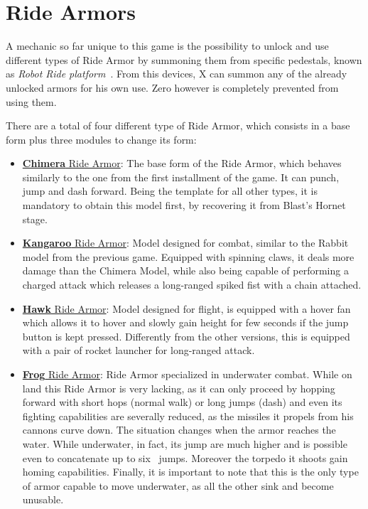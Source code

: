 \section{Ride Armors}
A mechanic so far unique to this game is the possibility to unlock and use different types of Ride Armor by summoning them from specific pedestals, known as \textit{Robot Ride platform}~\cite{X3:Manual}. From this devices, X can summon any of the already unlocked armors for his own use. Zero however is completely prevented from using them.

There are a total of four different type of Ride Armor, which consists in a base form plus three modules to change its form:
\begin{itemize}
	\item \hyperlink{vehicle:Ride_Armor_Chimera}{\textbf{Chimera} Ride Armor}: The base form of the Ride Armor, which behaves similarly to the one from the first installment of the game. It can punch, jump and dash forward. Being the template for all other types, it is mandatory to obtain this model first, by recovering it from Blast's Hornet stage.
	\item \hyperlink{vehicle:Ride_Armor_Kangaroo}{\textbf{Kangaroo} Ride Armor}: Model designed for combat, similar to the Rabbit model from the previous game.  Equipped with spinning claws, it deals more damage than the Chimera Model, while also being capable of performing a  charged attack which releases a long-ranged spiked fist with a chain attached.
	\item \hyperlink{vehicle:Ride_Armor_Hawk}{\textbf{Hawk} Ride Armor}: Model designed for flight, is equipped with a hover fan which allows it to hover and slowly gain height for few seconds if the jump button is kept pressed. Differently from the other versions, this is equipped with a pair of rocket launcher for long-ranged attack.
	\item \hyperlink{vehicle:Ride_Armor_Frog}{\textbf{Frog} Ride Armor}: Ride Armor specialized in underwater combat. While on land this Ride Armor is very lacking, as it can only proceed by hopping forward with short hops (normal walk) or long jumps (dash) and even its fighting capabilities are severally reduced, as the missiles it propels from his cannons curve down. The situation changes when the armor reaches the water. While underwater, in fact, its jump are much higher and is possible even to concatenate up to six~\cite{wiki:Chimera_Armor} jumps. Moreover the torpedo it shoots gain homing capabilities. Finally, it is important to note that this is the only type of armor capable to move underwater, as all the other sink and become unusable.
\end{itemize}
